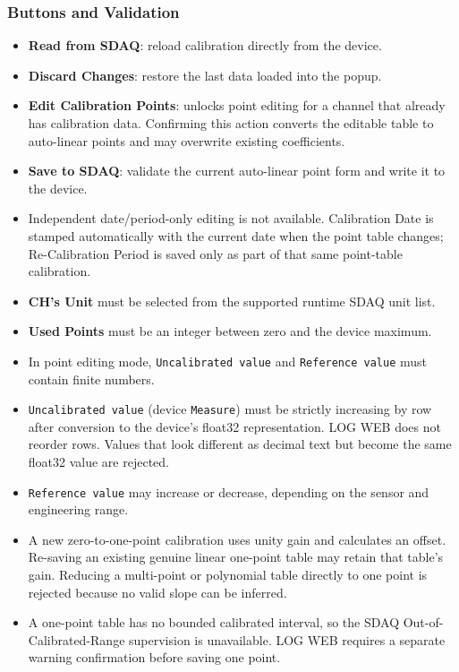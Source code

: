 \documentclass[11pt,a4paper]{article}
\begin{document}
\subsubsection{Buttons and Validation}
\begin{itemize}
\item \textbf{Read from SDAQ}: reload calibration directly from the device.
\item \textbf{Discard Changes}: restore the last data loaded into the popup.
\item \textbf{Edit Calibration Points}: unlocks point editing for a channel that already has calibration data. Confirming this action converts the editable table to auto-linear points and may overwrite existing coefficients.
\item \textbf{Save to SDAQ}: validate the current auto-linear point form and write it to the device.
\item Independent date/period-only editing is not available. Calibration Date is stamped automatically with the current date when the point table changes; Re-Calibration Period is saved only as part of that same point-table calibration.
\item \textbf{CH's Unit} must be selected from the supported runtime SDAQ unit list.
\item \textbf{Used Points} must be an integer between zero and the device maximum.
\item In point editing mode, \texttt{Uncalibrated value} and \texttt{Reference value} must contain finite numbers.
\item \texttt{Uncalibrated value} (device \texttt{Measure}) must be strictly increasing by row after conversion to the device's float32 representation. LOG WEB does not reorder rows. Values that look different as decimal text but become the same float32 value are rejected.
\item \texttt{Reference value} may increase or decrease, depending on the sensor and engineering range.
\item A new zero-to-one-point calibration uses unity gain and calculates an offset. Re-saving an existing genuine linear one-point table may retain that table's gain. Reducing a multi-point or polynomial table directly to one point is rejected because no valid slope can be inferred.
\item A one-point table has no bounded calibrated interval, so the SDAQ Out-of-Calibrated-Range supervision is unavailable. LOG WEB requires a separate warning confirmation before saving one point.
\end{itemize}
\end{document}
